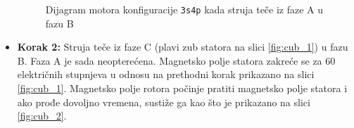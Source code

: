 \documentclass[diplomskirad]{fer}
\begin{document}
\begin{itemize}
\begin{figure}[h!]
		      \caption{Dijagram motora konfiguracije \texttt{3s4p} kada struja teče iz faze A u fazu B}
		      \label{fig:aub}
	      \end{figure}

	\item \textbf{Korak 2:} Struja teče iz faze C (plavi zub statora na slici \ref{fig:cub_1}) u fazu B. Faza A je sada neopterećena. Magnetsko polje statora zakreće se za 60 električnih stupnjeva u odnosu na prethodni korak prikazano na slici \ref{fig:cub_1}{}. Magnetsko polje rotora počinje pratiti magnetsko polje statora i ako prođe dovoljno vremena, sustiže ga kao što je prikazano na slici \ref{fig:cub_2}{}.
	      \begin{figure}[h!]
		      \centering


\end{figure}
\end{itemize}
\end{document}
